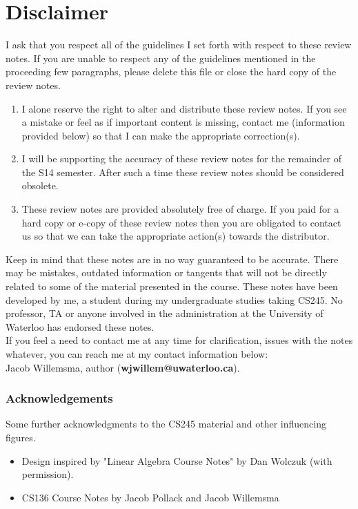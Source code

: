 \section*{Disclaimer}

I ask that you respect all of the guidelines I set forth with respect to these review notes. If you are unable to respect any of the guidelines mentioned in the proceeding few paragraphs, please delete this file or close the hard copy of the review notes.\\

\begin{enumerate}

\item I alone reserve the right to alter and distribute these review notes. If you see a mistake or feel as if important content is missing, contact me (information provided below) so that I can make the appropriate correction(s).

\item I will be supporting the accuracy of these review notes for the remainder of the S14 semester. After such a time these review notes should be considered obsolete.

\item These review notes are provided absolutely free of charge. If you paid for a hard copy or e-copy of these review notes then you are obligated to contact us so that we can take the appropriate action(s) towards the distributor.

\end{enumerate}

Keep in mind that these notes are in no way guaranteed to be accurate. There may be mistakes, outdated information or tangents that will not be directly related to some of the material presented in the course. These notes have been developed by me, a student during my undergraduate studies taking CS245. No professor, TA or anyone involved in the administration at the University of Waterloo has endorsed these notes.\\

If you feel a need to contact me at any time for clarification, issues with the notes whatever, you can reach me at my contact information below:\\
Jacob Willemsma, author (\textbf{wjwillem@uwaterloo.ca}).\\

\subsubsection*{Acknowledgements}

Some further acknowledgments to the CS245 material and other influencing figures.

\begin{itemize}

\item Design inspired by "Linear Algebra Course Notes" by Dan Wolczuk (with permission).
\item CS136 Course Notes by Jacob Pollack and Jacob Willemsma

\end{itemize}